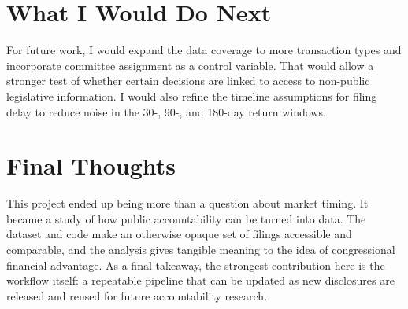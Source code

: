 \documentclass[12pt]{article}
\begin{document}
\section*{What I Would Do Next}
For future work, I would expand the data coverage to more transaction types and incorporate committee assignment as a control variable. That would allow a stronger test of whether certain decisions are linked to access to non-public legislative information. I would also refine the timeline assumptions for filing delay to reduce noise in the 30-, 90-, and 180-day return windows.

\section*{Final Thoughts}
This project ended up being more than a question about market timing. It became a study of how public accountability can be turned into data. The dataset and code make an otherwise opaque set of filings accessible and comparable, and the analysis gives tangible meaning to the idea of congressional financial advantage. As a final takeaway, the strongest contribution here is the workflow itself: a repeatable pipeline that can be updated as new disclosures are released and reused for future accountability research.
\end{document}
